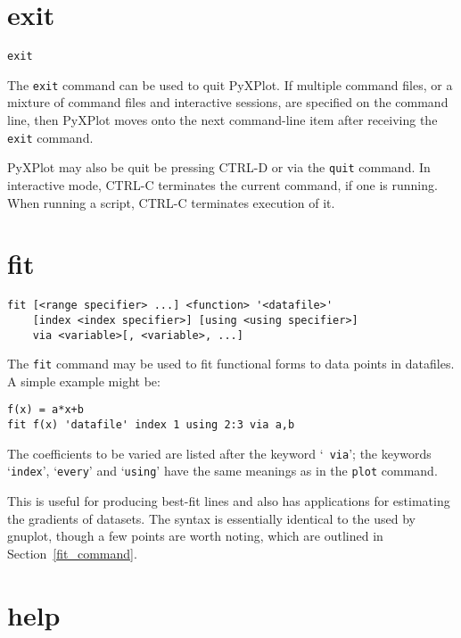 \documentclass[a4paper,onecolumn,11pt]{book}
\begin{document}
\section{exit}

\begin{verbatim}
exit
\end{verbatim}

The {\tt exit} command can be used to quit PyXPlot. If multiple command files,
or a mixture of command files and interactive sessions, are specified on the
command line, then PyXPlot moves onto the next command-line item after receiving
the {\tt exit} command.

PyXPlot may also be quit be pressing CTRL-D or via the {\tt quit} command. In
interactive mode, CTRL-C terminates the current command, if one is running.
When running a script, CTRL-C terminates execution of it.


\section{fit}

\begin{verbatim}
fit [<range specifier> ...] <function> '<datafile>'
    [index <index specifier>] [using <using specifier>]
    via <variable>[, <variable>, ...]
\end{verbatim}

The {\tt fit} command may be used to fit functional forms to data points in
datafiles. A simple example might be:

\begin{verbatim}
f(x) = a*x+b
fit f(x) 'datafile' index 1 using 2:3 via a,b
\end{verbatim}

\noindent The coefficients to be varied are listed after the keyword `{\tt
via}'; the keywords `{\tt index}', `{\tt every}' and `{\tt using}' have the
same meanings as in the {\tt plot} command.

This is useful for producing best-fit lines and also has applications for
estimating the gradients of datasets.  The syntax is essentially identical to
the used by gnuplot, though a few points are worth noting, which are outlined
in Section~\ref{fit_command}.

\section{help}
\end{document}
